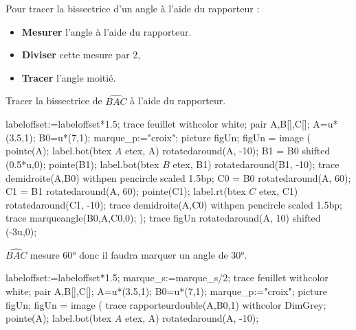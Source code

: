 \begin{changemargin}{0mm}{-25mm}
    \begin{methode}
        Pour tracer la bissectrice d'un angle à l'aide du rapporteur :
        \begin{itemize}
            \item {\bfseries Mesurer} l'angle à l'aide du rapporteur.
            \item {\bfseries Diviser} cette mesure par 2,
            \item {\bfseries Tracer} l'angle moitié.
        \end{itemize}
        \exercice
        Tracer la bissectrice de $\widehat{BAC}$ à l'aide du rapporteur. \par\vspace*{5mm}
        \begin{Geometrie}[CoinHD={(6.5u,5u)}]
            labeloffset:=labeloffset*1.5;
            trace feuillet withcolor white;
            pair A,B[],C[];
            A=u*(3.5,1);
            B0=u*(7,1);
            marque_p:="croix";
            picture figUn;
            figUn = image (
                pointe(A);
                label.bot(btex $A$ etex, A) rotatedaround(A, -10);
                B1 = B0 shifted (0.5*u,0);
                pointe(B1);
                label.bot(btex $B$ etex, B1)  rotatedaround(B1, -10);
                trace demidroite(A,B0) withpen pencircle scaled 1.5bp;
                C0 = B0 rotatedaround(A, 60);
                C1 = B1 rotatedaround(A, 60);
                pointe(C1);
                label.rt(btex $C$ etex, C1)  rotatedaround(C1, -10);            
                trace demidroite(A,C0) withpen pencircle scaled 1.5bp;
                trace marqueangle(B0,A,C0,0);
            );
            trace figUn rotatedaround(A, 10) shifted (-3u,0);
        \end{Geometrie}
        \correction
        $\widehat{BAC}$ mesure \ang{60} donc il faudra marquer un angle de \ang{30}. \par\vspace*{5mm}
        \begin{Geometrie}[CoinHD={(8.5u,5u)}]
            labeloffset:=labeloffset*1.5;
            marque_s:=marque_s/2;
            trace feuillet withcolor white;
            pair A,B[],C[];
            A=u*(3.5,1);
            B0=u*(7,1);
            marque_p:="croix";
            picture figUn;
            figUn = image (
                trace rapporteurdouble(A,B0,1) withcolor DimGrey;
                pointe(A);
                label.bot(btex $A$ etex, A) rotatedaround(A, -10);

\end{Geometrie}
\end{methode}
\end{changemargin}
